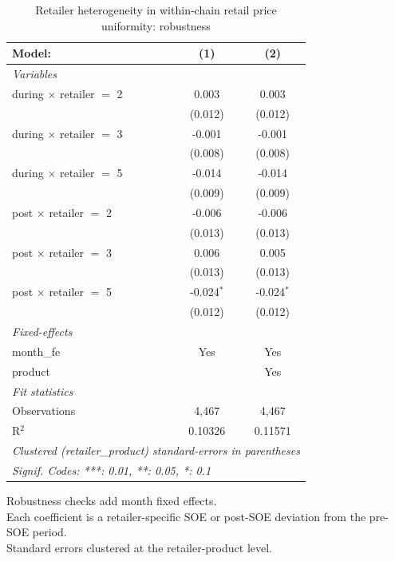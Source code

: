 
\begin{table}[htbp]
   \caption{\label{tab:uniformity_heterog_retail_robust} Retailer heterogeneity in within-chain retail price uniformity: robustness}
   \centering
   \begin{tabular}{lcc}
      \tabularnewline \midrule \midrule
      Model:                          & (1)          & (2)\\  
      \midrule
      \emph{Variables}\\
      during $\times$ retailer $=$ 2  & 0.003        & 0.003\\   
                                      & (0.012)      & (0.012)\\   
      during $\times$ retailer $=$ 3  & -0.001       & -0.001\\   
                                      & (0.008)      & (0.008)\\   
      during $\times$ retailer $=$ 5  & -0.014       & -0.014\\   
                                      & (0.009)      & (0.009)\\   
      post $\times$ retailer $=$ 2    & -0.006       & -0.006\\   
                                      & (0.013)      & (0.013)\\   
      post $\times$ retailer $=$ 3    & 0.006        & 0.005\\   
                                      & (0.013)      & (0.013)\\   
      post $\times$ retailer $=$ 5    & -0.024$^{*}$ & -0.024$^{*}$\\   
                                      & (0.012)      & (0.012)\\   
      \midrule
      \emph{Fixed-effects}\\
      month\_fe                       & Yes          & Yes\\  
      product                         &              & Yes\\  
      \midrule
      \emph{Fit statistics}\\
      Observations                    & 4,467        & 4,467\\  
      R$^2$                           & 0.10326      & 0.11571\\  
      \midrule \midrule
      \multicolumn{3}{l}{\emph{Clustered (retailer\_product) standard-errors in parentheses}}\\
      \multicolumn{3}{l}{\emph{Signif. Codes: ***: 0.01, **: 0.05, *: 0.1}}\\
   \end{tabular}
   
   \par \raggedright 
   Robustness checks add month fixed effects.\\
   Each coefficient is a retailer-specific SOE or post-SOE deviation from the pre-SOE period.\\
   Standard errors clustered at the retailer-product level.
\end{table}


